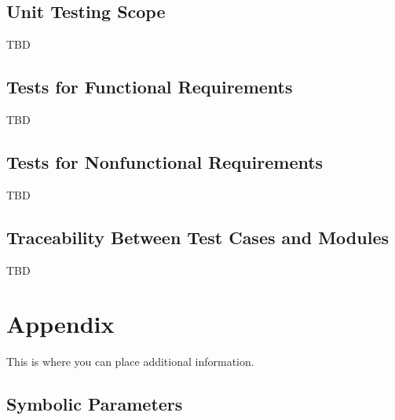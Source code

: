 \documentclass[12pt, titlepage]{article}
\begin{document}
\subsection{Unit Testing Scope}
TBD

\subsection{Tests for Functional Requirements}
TBD

\subsection{Tests for Nonfunctional Requirements}
TBD

\subsection{Traceability Between Test Cases and Modules}
TBD

\newpage

\section{Appendix}

This is where you can place additional information.

\subsection{Symbolic Parameters}
\end{document}
